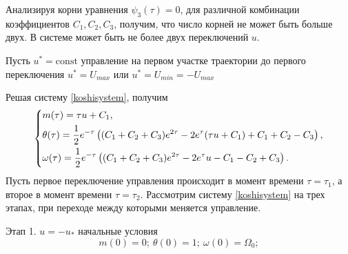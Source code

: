 \documentclass[a4paper,14pt]{article}
\theoremstyle{plain} %
\theoremstyle{definition} %
\theoremstyle{remark} %
\begin{document}
{Анализируя корни уравнения $\psi_3(\tau)=0$, для различной комбинации
коэффициентов $C_1,C_2,C_3$, получим, что число корней не может быть больше двух. В системе может быть не более двух переключений $u$.

Пусть $u^*=\mathrm{const}$ управление на первом участке траектории до первого переключения $u^*=U_{max}$ или $u^*=U_{min}=-U_{max}$

Решая систему \eqref{koshisystem}, получим
\begin{equation}\label{solvekoshi}
    \left\{ {\begin{aligned}
                 & m(\tau) = \tau u+C_1, \hfill                                                            \\
                 & \theta(\tau) = \frac{1}{2} e^{-\tau } \left((C_1+C_2+C_3) e^{2 \tau }-2 e^{\tau } (\tau
                u+C_1)+C_1+C_2-C_3\right), \hfill                                                          \\
                 & \omega(\tau) = \frac{1}{2} e^{-\tau } \left((C_1+C_2+C_3) e^{2 \tau }-2 e^{\tau }
                u-C_1-C_2+C_3\right). \hfill                                                               \\
            \end{aligned}} \right.
\end{equation}
\newpage
Пусть первое переключение управления происходит в момент времени
$\tau=\tau_1$, а второе в момент времени
$\tau=\tau_2$. Рассмотрим систему \eqref{koshisystem} на трех этапах,
при переходе между которыми меняется управление.

Этап 1. $u=-u_*$ начальные условия
\[
    m(0)=0;\ \theta(0)=1;\ \omega(0)=\Omega_0;
\]

}
\end{document}
